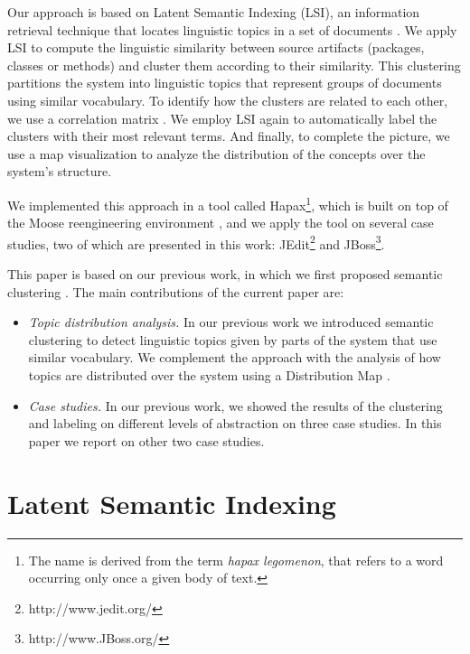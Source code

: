 \documentclass[10pt]{book}
\begin{document}
Our approach is based on Latent Semantic Indexing (LSI), an information retrieval technique that locates linguistic topics in a set of documents \cite{Deer90a,Marc04a}. We apply LSI to compute the linguistic similarity between source artifacts (\eg packages, classes or methods) and cluster them according to their similarity. This clustering partitions the system into linguistic topics that represent groups of documents using similar vocabulary. To identify how the clusters are related to each other, we use a correlation matrix \cite{Ling73a}. We employ LSI again to automatically label the clusters with their most relevant terms. And finally, to complete the picture, we use a map visualization to analyze the distribution of the concepts over the system's structure.

We implemented this approach in a tool called Hapax\footnote{The name is derived from the term \emph{hapax legomenon}, that refers to a word occurring only once a given body of text.}, which is built on top of the Moose reengineering environment \cite{Duca05a,Nier05c}, and we apply the tool on several case studies, two of which are presented in this work: JEdit\footnote{http://www.jedit.org/} and JBoss\footnote{http://www.JBoss.org/}.

This paper is based on our previous work, in which we first proposed semantic clustering \cite{Kuhn05a}. The main contributions of the current paper are:
\begin{itemize}

\item \emph{Topic distribution analysis.} In our previous work we introduced semantic clustering to detect linguistic topics given by parts of the system that use similar vocabulary. We complement the approach with the analysis of how topics are distributed over the system using a Distribution Map \cite{Duca06c}.

\item \emph{Case studies.} In our previous work, we showed the results of the clustering and labeling on different levels of abstraction on three case studies. In this paper we report on other two case studies.
\end{itemize}

\section{Latent Semantic Indexing}\label{sec:LSI}
\end{document}
